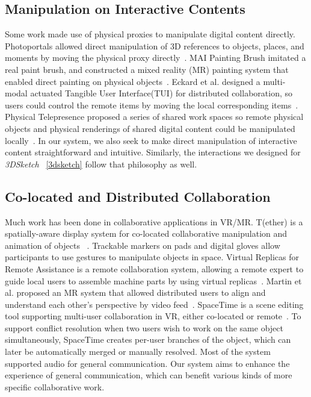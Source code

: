 \documentclass[chi_draft]{sigchi}
\begin{document}
\subsection{Manipulation on Interactive Contents}
Some work made use of physical proxies to manipulate digital content directly. Photoportals allowed direct manipulation of 3D references to objects, places, and moments by moving the physical proxy directly~\cite{kunert2014photoportals}. MAI Painting Brush imitated a real paint brush, and constructed a mixed reality
(MR) painting system that enabled direct painting on physical
objects~\cite{otsuki2010mai}. Eckard et al. designed a multi-modal actuated Tangible User Interface(TUI) for distributed collaboration, so users could control the remote items by moving the local corresponding items~\cite{riedenklau2012integrated}. Physical Telepresence proposed a series of shared work spaces so remote physical objects and physical renderings of shared digital content could be manipulated locally~\cite{leithinger2014physical}. In our system, we also seek to make direct manipulation of interactive content straightforward and intuitive. Similarly, the interactions we designed for \textit{3DSketch} ~\ref{3dsketch} follow that philosophy as well.

\subsection{Co-located and Distributed Collaboration}
Much work has been done in collaborative applications in VR/MR. T(ether) is a spatially-aware display system for co-located collaborative manipulation and animation of objects ~\cite{lakatos2014t}. Trackable markers on pads and digital gloves allow participants to use gestures to manipulate objects in space. Virtual Replicas for Remote Assistance is a remote collaboration system, allowing a remote expert to guide local users to assemble machine parts by using virtual replicas~\cite{oda2015virtual}.
Martin et al. proposed an MR system that allowed distributed users to align and understand each other's perspective by video feed~\cite{feick2018mixed}.
SpaceTime is a scene editing tool supporting multi-user collaboration in VR, either co-located or remote~\cite{xia2018spacetime}. To support conflict resolution when two users wish to work on the same object simultaneously, SpaceTime creates per-user branches of the object, which can later be automatically merged or manually resolved. Most of the system supported audio for general communication. Our system aims to enhance the experience of general communication, which can benefit various kinds of more specific collaborative work.
\end{document}
